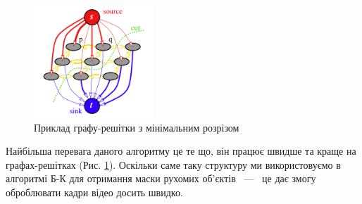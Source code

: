 \begin{figure}[h]
    \centering
    \includegraphics[width=0.4\textwidth]{images/graph_cut}
    \caption{Приклад графу-решітки з мінімальним розрізом \cite{boykov_kolmogorov}
        \label{fig:graph_lattice}
    }
\end{figure}
Найбільша перевага даного алгоритму це те що, він працює швидше та краще на графах-решітках
(Рис. \ref{fig:graph_lattice}).
Оскільки саме таку структуру ми використовуємо в алгоритмі Б-К для отримання маски рухомих
об'єктів ~---~ це дає змогу оброблювати кадри відео досить швидко.
